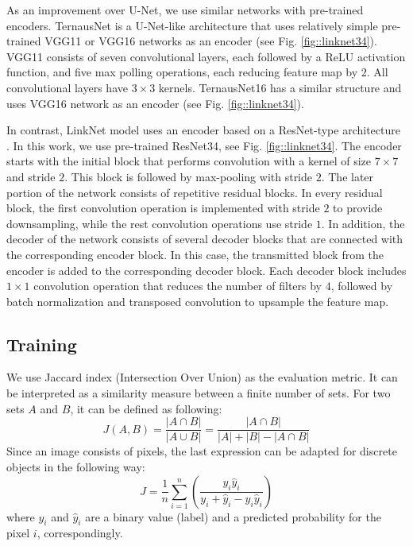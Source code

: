 \documentclass[runningheads,a4paper]{llncs}[2015/06/24]
\begin{document}
As an improvement over U-Net, we use similar networks with pre-trained encoders. TernausNet \cite{iglovikov2018ternausnet} is a U-Net-like architecture that uses relatively simple pre-trained VGG11 or VGG16 \cite{simonyan2014vgg} networks as an encoder (see Fig. \ref{fig::linknet34}). VGG11 consists of seven convolutional layers, each followed by a ReLU activation function, and five max polling operations, each reducing feature map by $2$. All convolutional layers have $3\times3$ kernels. TernausNet16 has a similar structure and uses VGG16 network as an encoder (see Fig. \ref{fig::linknet34}).

In contrast, LinkNet \cite{chaurasia2017linknet} model uses an encoder based on a ResNet-type architecture \cite{he2016resnet}. In this work, we use pre-trained ResNet34, see Fig. \ref{fig::linknet34}. The encoder starts with the initial block that performs convolution with a kernel of size $7\times7$ and stride $2$. This block is followed by max-pooling with stride $2$. The later portion of the network consists of repetitive residual blocks. In every residual block, the first convolution operation is implemented with stride $2$ to provide downsampling, while the rest convolution operations use stride $1$. In addition, the decoder of the network consists of several decoder blocks that are connected with the corresponding encoder block. In this case, the transmitted block from the encoder is added to the corresponding decoder block. Each decoder block includes $1\times1$ convolution operation that reduces the number of filters by $4$, followed by batch normalization and transposed convolution to upsample the feature map.

\subsection{Training}
We use Jaccard index (Intersection Over Union) as the evaluation metric. It can be interpreted as a similarity measure between a finite number of sets. For two sets $A$ and $B$, it can be defined as following:
\begin{equation}
\label{jaccard_iou}
    J(A, B) = \frac{|A\cap B|}{|A\cup B|} = \frac{|A\cap B|}{|A|+|B|-|A\cap B|}
\end{equation}
Since an image consists of pixels, the last expression can be adapted for discrete objects in the following way:
\begin{equation}
\label{dicrjacc}
J=\frac{1}{n}\sum\limits_{i=1}^n\left(\frac{y_i\hat{y}_i}{y_{i}+\hat{y}_i-y_i\hat{y}_i}\right)
\end{equation}
where $y_i$ and $\hat{y}_i$ are a binary value (label) and a predicted probability for the pixel $i$, correspondingly.
\end{document}
